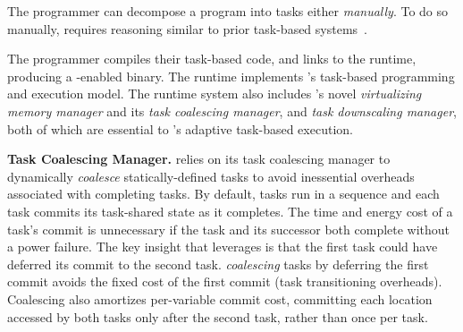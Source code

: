 
The programmer can decompose a program into tasks either {\em manually}. To do so manually,  requires reasoning similar to prior
task-based systems~\cite{chain,alpaca}.  
%
%

%
The programmer compiles their task-based code, and links to the \sys runtime, producing a \sys-enabled binary. The \sys runtime implements \sys's task-based programming and execution model. The runtime system also includes \sys's novel {\em virtualizing memory manager} and its {\em task coalescing manager}, and {\em task downscaling manager}, both of which are essential to \sys's adaptive task-based execution.

\textbf{\sys Task Coalescing Manager.} \sys relies on its task coalescing manager to dynamically {\em coalesce} statically\hyp{}defined tasks to avoid inessential overheads associated with completing tasks. By default, tasks run in a sequence and each task commits its task-shared state as it completes.  The time and energy cost of a task's commit is unnecessary if the task and its successor both complete without a power failure. The key insight that \sys leverages is that the first task could have deferred its commit to the second task. {\em coalescing} tasks by deferring the first commit avoids the fixed cost of the first commit (task transitioning overheads). Coalescing also amortizes per-variable commit cost, committing each  location accessed by both tasks only after the second task, rather than once per task.

